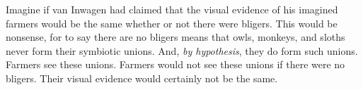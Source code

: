 \documentclass[11pt]{article}
\newenvironment{squote}{%
\begin{spacing}{1}
       	\begin{list}{}{%
\setlength{\labelwidth}{0pt}%
\rightmargin\leftmargin%
}
\item\relax
}{%
\end{list}%
\end{spacing}
}
\begin{document}
\begin{spacing}{1.25}
Imagine if van Inwagen had claimed that the visual evidence of his
imagined farmers would be the same whether or not there were bligers.
This would be nonsense, for to say there are no bligers means that
owls, monkeys, and sloths never form their symbiotic unions.  And,
{\em by hypothesis}, they do form such unions.  Farmers see these
unions.  Farmers would not see these unions if there were no bligers.
Their visual evidence would certainly not be the same.






\end{spacing}
\end{document}

